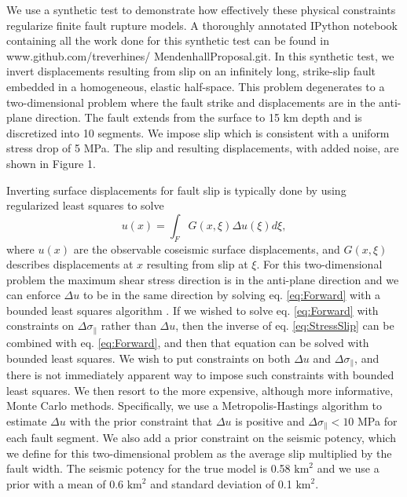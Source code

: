 \documentclass[12pt]{article}
\begin{document}
We use a synthetic test to demonstrate how effectively these physical constraints regularize finite fault rupture models.  A thoroughly annotated IPython notebook containing all the work done for this synthetic test can be found in www.github.com/treverhines/ MendenhallProposal.git.  In this synthetic test, we invert displacements resulting from slip on an infinitely long, strike-slip fault embedded in a homogeneous, elastic half-space.  This problem degenerates to a two-dimensional problem where the fault strike and displacements are in the anti-plane direction.  The fault extends from the surface to 15 km depth and is discretized into 10 segments.  We impose slip which is consistent with a uniform stress drop of 5 MPa.  The slip and resulting displacements, with added noise, are shown in Figure 1.

Inverting surface displacements for fault slip is typically done by using regularized least squares to solve
\begin{equation}\label{eq:Forward}
  u(x) = \int_F G(x,\xi) \Delta u(\xi) d\xi,
\end{equation}
where $u(x)$ are the observable coseismic surface displacements, and $G(x,\xi)$ describes displacements at $x$ resulting from slip at $\xi$.  For this two-dimensional problem the maximum shear stress direction is in the anti-plane direction and we can enforce $\Delta u$ to be in the same direction by solving eq. \ref{eq:Forward} with a bounded least squares algorithm \citep{Lawson1995}.  If we wished to solve eq. \ref{eq:Forward} with constraints on $\Delta \sigma_\parallel$ rather than $\Delta u$, then the inverse of eq. \ref{eq:StressSlip} can be combined with eq. \ref{eq:Forward}, and then that equation can be solved with bounded least squares. We wish to put constraints on both $\Delta u$ and $\Delta \sigma_\parallel$, and there is not immediately apparent way to impose such constraints with bounded least squares.  We then resort to the more expensive, although more informative, Monte Carlo methods.  Specifically, we use a Metropolis-Hastings algorithm to estimate $\Delta u$ with the prior constraint that $\Delta u$ is positive and $\Delta \sigma_\parallel < 10$ MPa for each fault segment.  We also add a prior constraint on the seismic potency, which we define for this two-dimensional problem as the average slip multiplied by the fault width.  The seismic potency for the true model is 0.58 $\mathrm{km}^2$ and we use a prior with a mean of  0.6 $\mathrm{km}^2$ and standard deviation of 0.1 $\mathrm{km}^2$.  
\end{document}
